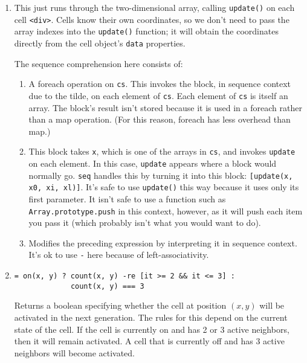 \documentclass{report}
\begin{document}
\begin{enumerate}
\item[{\tt cs *!\textasciitilde[x *!update] -seq}]
  This just runs through the two-dimensional array, calling {\tt update()} on each cell \verb|<div>|. Cells know their own coordinates, so we don't need to pass the array indexes into
  the {\tt update()} function; it will obtain the coordinates directly from the cell object's {\tt data} properties.

  The sequence comprehension here consists of:

\begin{enumerate}
\item[{\tt cs *!\textasciitilde[...]}]
  A foreach operation on {\tt cs}. This invokes the block, in sequence context due to the tilde, on each element of {\tt cs}. Each element of {\tt cs} is itself an array. The
  block's result isn't stored because it is used in a foreach rather than a map operation. (For this reason, foreach has less overhead than map.)

\item[{\tt x *!update}]
  This block takes {\tt x}, which is one of the arrays in {\tt cs}, and invokes {\tt update} on each element. In this case, {\tt update} appears where a block would normally go.
  {\tt seq} handles this by turning it into this block: {\tt [update(x, x0, xi, xl)]}. It's safe to use {\tt update()} this way because it uses only its first parameter. It isn't
  safe to use a function such as {\tt Array.prototype.push} in this context, however, as it will push each item you pass it (which probably isn't what you would want to do).

\item[{\tt -seq}]
  Modifies the preceding expression by interpreting it in sequence context. It's ok to use {\tt -} here because of left-associativity.
\end{enumerate}

\item[{\tt new\_state(x, y)}]
\begin{verbatim}
= on(x, y) ? count(x, y) -re [it >= 2 && it <= 3] :
             count(x, y) === 3
\end{verbatim}

  Returns a boolean specifying whether the cell at position $(x, y)$ will be activated in the next generation. The rules for this depend on the current state of the cell. If the cell
  is currently on and has 2 or 3 active neighbors, then it will remain activated. A cell that is currently off and has 3 active neighbors will become activated.


\end{enumerate}
\end{document}
